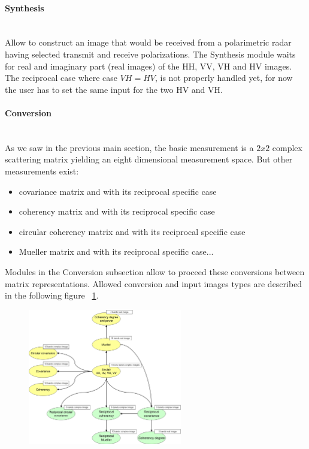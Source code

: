 \paragraph{Synthesis} \\

Allow to construct an image that would be received from a polarimetric radar 
having selected transmit and receive polarizations.
The Synthesis module waits for real and imaginary part (real images) of the HH, VV, VH and HV images.
The reciprocal case where case $VH=HV$, is not properly handled yet, for now the user
has to set the same input for the two HV and VH.

\paragraph{Conversion} \\

As we saw in the previous main section, the basic 
measurement is a $2x2$ complex scattering matrix yielding an eight dimensional 
measurement space. But other measurements exist:
\begin{itemize}
\item covariance matrix and with its reciprocal specific case
\item coherency matrix and with its reciprocal specific case
\item circular coherency matrix and with its reciprocal specific case
\item Mueller matrix and with its reciprocal specific case...
\end{itemize}

Modules in the Conversion subsection allow to proceed these conversions between matrix representations.
Allowed conversion and input images types are described in the following figure ~\ref{fig:sarpolconv}.

\begin{figure}
  \center
  \includegraphics[width=0.6\textwidth]{../Art/MonteverdiImages/monteverdi_sarpol_conversion_schema.png}
  \label{fig:sarpolconv}
\end{figure}

